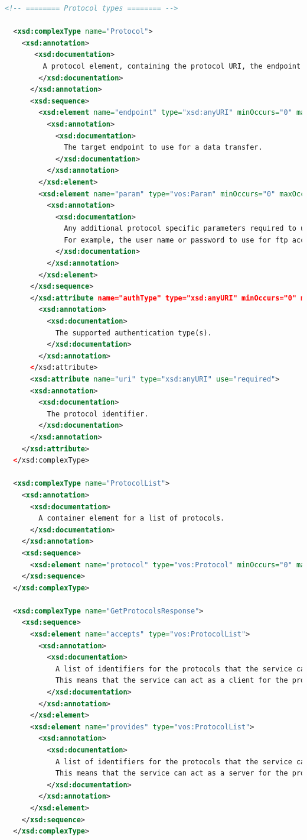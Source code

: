 \documentclass[11pt,a4paper]{ivoa}
\begin{document}
\begin{lstlisting}[language=xml, basicstyle=\scriptsize]
  <!-- ======== Protocol types ======== -->

  <xsd:complexType name="Protocol">
    <xsd:annotation>
       <xsd:documentation>
         A protocol element, containing the protocol URI, the endpoint and any protocol specific parameters.  
        </xsd:documentation>
      </xsd:annotation>
      <xsd:sequence>
        <xsd:element name="endpoint" type="xsd:anyURI" minOccurs="0" maxOccurs="1">
          <xsd:annotation>
            <xsd:documentation>
              The target endpoint to use for a data transfer.
            </xsd:documentation>
          </xsd:annotation>
        </xsd:element>
        <xsd:element name="param" type="vos:Param" minOccurs="0" maxOccurs="unbounded" nillable="true">
          <xsd:annotation>
            <xsd:documentation>
              Any additional protocol specific parameters required to use the endpoint.
              For example, the user name or password to use for ftp access.
            </xsd:documentation>
          </xsd:annotation>
        </xsd:element>
      </xsd:sequence>
      </xsd:attribute name="authType" type="xsd:anyURI" minOccurs="0" maxOccurs="unbounded" nillable="true">
        <xsd:annotation>
          <xsd:documentation>
            The supported authentication type(s).
          </xsd:documentation>
        </xsd:annotation>
      </xsd:attribute>
      <xsd:attribute name="uri" type="xsd:anyURI" use="required">
      <xsd:annotation>
        <xsd:documentation>
          The protocol identifier.
        </xsd:documentation>
      </xsd:annotation>
    </xsd:attribute>
  </xsd:complexType>

  <xsd:complexType name="ProtocolList">
    <xsd:annotation>
      <xsd:documentation>
        A container element for a list of protocols.
      </xsd:documentation>
    </xsd:annotation>
    <xsd:sequence>
      <xsd:element name="protocol" type="vos:Protocol" minOccurs="0" maxOccurs="unbounded" nillable="true"/>
    </xsd:sequence>
  </xsd:complexType>

  <xsd:complexType name="GetProtocolsResponse">
    <xsd:sequence>
      <xsd:element name="accepts" type="vos:ProtocolList">
        <xsd:annotation>
          <xsd:documentation>
            A list of identifiers for the protocols that the service can accept.
            This means that the service can act as a client for the protocol. 
          </xsd:documentation>
        </xsd:annotation>
      </xsd:element>
      <xsd:element name="provides" type="vos:ProtocolList">
        <xsd:annotation>
          <xsd:documentation>
            A list of identifiers for the protocols that the service can provide.
            This means that the service can act as a server for the protocol. 
          </xsd:documentation>
        </xsd:annotation>
      </xsd:element>
    </xsd:sequence>
  </xsd:complexType>


\end{lstlisting}
\end{document}
